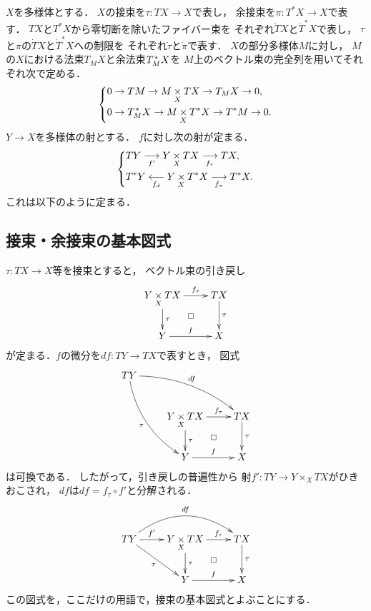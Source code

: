 \documentclass[leqno, 10pt, a4paper, dvipdfmx]{jsarticle}
\theoremstyle{definition}
\numberwithin{equation}{section}
\newcommand{\pb}[1][]{\mathbin{\mathop{\times}\limits_{#1}}}
\newcommand{\dpb}[1][]{\mathbin{\mathop{\times}\limits_{#1}}}
\theoremstyle{mystyle}
\newcommand{\mpb}[1][]{{#1}_{\pi}} %
\newcommand{\mdiff}[1][]{{#1}_{d}} %
\newcommand{\cotb}[1][]{T^{\ast}{#1}}
\newcommand{\conm}[2][]{T_{#1}^{\hspace{0.7pt}\ast}{#2}}
\newcommand{\norb}[2][]{T_{#1}{#2}}
\newcommand{\cotn}[1][]{\dot{T}^{\ast}{#1}}
\newcommand{\tann}[1][]{\dot{T}{#1}}
\begin{document}
\(X\)を多様体とする．
\(X\)の接束を\(\tau\colon TX\to X\)で表し，
余接束を\(\pi\colon \cotb[X]\to X\)で表す．
\(TX\)と\(\cotb[X]\)から零切断を除いたファイバー束を
それぞれ\(\tann[X]\)と\(\cotn[X]\)で表し，
\(\tau\)と\(\pi\)の\(\tann[X]\)と\(\cotn[X]\)への制限を
それぞれ\(\dot{\tau}\)と\(\dot{\pi}\)で表す．
\(X\)の部分多様体\(M\)に対し，
\(M\)の\(X\)における法束\(\norb[M]{X}\)と余法束\(\conm[M]{X}\)を
\(M\)上のベクトル束の完全列を用いてそれぞれ次で定める．
\begin{equation}\label{eq:A.2.1}
    \begin{dcases}
        0\to TM\to M\dpb[X]TX\to\norb[M]{X}\to0,\\
        0\to\conm[M]{X}\to M\dpb[X]\cotb[X]\to\cotb[M]\to0.
    \end{dcases}    
\end{equation}
\(Y\to X\)を多様体の射とする．
\(f\)に対し次の射が定まる．
\begin{equation}\label{eq:A.2.2}
    \begin{dcases}
        TY\underset{f'}{\longrightarrow}Y\dpb[X]TX\underset{f_{\tau}}{\longrightarrow}TX,\\
        \cotb[Y]\underset{\mdiff[f]}{\longleftarrow}Y\dpb[X]\cotb[X]\underset{\mpb[f]}{\longrightarrow}\cotb[X].
    \end{dcases}
\end{equation}
これは以下のように定まる．
\subsection*{接束・余接束の基本図式}
\(\tau\colon TX\to X\)等を接束とすると，
ベクトル束の引き戻し
\[\xymatrix{
  Y\pb[X]TX
  \ar[r]^-{f_{\tau}}
  \ar[d]^-{\tau}
  \ar@{}[dr]|\square
  &
  TX
  \ar[d]^-{\tau}
  \\
  Y\ar[r]^-{f}&X
}\]
が定まる．\(f\)の微分を\(df\colon TY\to TX\)で表すとき，
図式
\[\xymatrix{
  TY
  \ar@/^1pc/[rrd]^-{df}
  \ar@/_1pc/[rdd]_-{\tau}\\
  &Y\pb[X]TX
  \ar[r]^-{f_{\tau}}
  \ar[d]^-{\tau}
  \ar@{}[dr]|\square
  &
  TX
  \ar[d]^-{\tau}
  \\
  &Y\ar[r]^-{f}&X
}\]
は可換である．
したがって，引き戻しの普遍性から
射\(f'\colon TY\to Y\mathbin{\times_{X}}TX\)がひきおこされ，
\(df\)は\(df=f_{\tau}\circ f'\)と分解される．
\[\xymatrix{
  TY
  \ar@/^2pc/[rr]^-{df}
  \ar[r]^-{f'}
  \ar[rd]_-{\tau}
  &Y\pb[X]TX
  \ar[r]^-{f_{\tau}}
  \ar[d]^-{\tau}
  \ar@{}[dr]|\square
  &
  TX
  \ar[d]^-{\tau}
  \\
  &Y\ar[r]^-{f}&X
}\]
この図式を，ここだけの用語で，接束の基本図式とよぶことにする．
\end{document}

